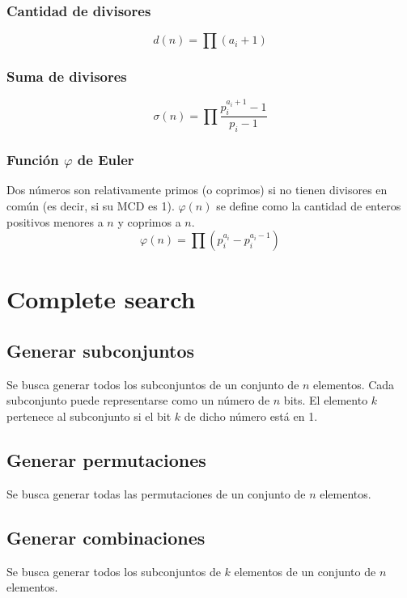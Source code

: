 \documentclass{article}
\begin{document}
\begin{multicols}{2}
		\subsubsection{Cantidad de divisores}
		\[ d(n) = \prod (a_{i} + 1) \]
		
		\subsubsection{Suma de divisores}
		\[ 
			\sigma (n) = \prod \frac{p_{i}^{a_{i} + 1} - 1}{p_{i} - 1}
		\]
		
		\subsubsection{Función $\varphi$ de Euler}
		Dos números son relativamente primos (o coprimos) si no tienen divisores en común (es decir, si su MCD es 1). \( \varphi (n) \) se define como la cantidad de enteros positivos menores a \( n \) y coprimos a \( n \). 
		\[ 
			\varphi (n) = \prod (p_{i}^{a_{i}} - p_{i}^{a_{i}-1})
		\]
		
		
		
\section{Complete search}
	\subsection{Generar subconjuntos}
	Se busca generar todos los subconjuntos de un conjunto de \( n \) elementos. Cada subconjunto puede representarse como un número de \( n \) bits. El elemento \( k \) pertenece al subconjunto si el bit \( k \) de dicho número está en 1.
	
	
	\subsection{Generar permutaciones}
	Se busca generar todas las permutaciones de un conjunto de \( n \) elementos.
	
	
	\subsection{Generar combinaciones}
	Se busca generar todos los subconjuntos de \( k \) elementos de un conjunto de \( n \) elementos.
	
		

\end{multicols}
\end{document}
